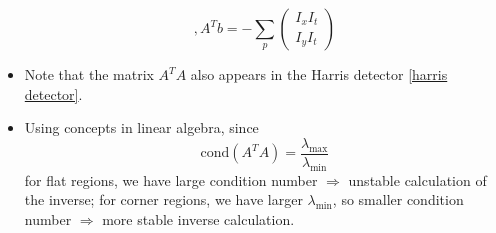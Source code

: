 \documentclass[twocolumn,landscape,10pt]{article}
\theoremstyle{definition}
\begin{document}
\begin{itemize}
\[            ,A^Tb=-\sum_p
            \begin{pmatrix}
                I_xI_t \\
                I_yI_t
            \end{pmatrix} 
        \]
    \item Note that the matrix $A^TA$ also appears in the Harris detector
        \ref{harris detector}.
    \item Using concepts in linear algebra, since
        \[
            \text{cond}(A^TA)=\frac{\lambda_\text{max}}{\lambda_\text{min}}
        \]
        for flat regions, we have large condition number $\Longrightarrow$
        unstable calculation of the inverse; for corner regions, we have larger
        $\lambda_\text{min}$, so smaller condition number $\Longrightarrow$ more
        stable inverse calculation.


\end{itemize}
\end{document}
